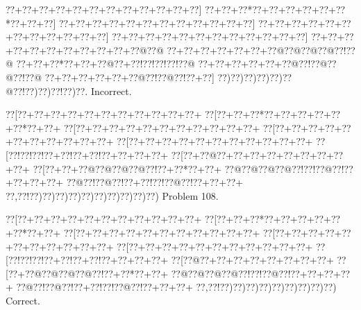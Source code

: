 \documentclass[a5paper]{article}
\begin{document}
\begin{center}
{\goo
\0??+\0??+\0??+\0??+\0??+\0??+\0??+\0??+\0??+\0??+\0??+\0??]
\0??+\0??+\0??*\0??+\0??+\0??+\0??+\0??+\0??*\0??+\0??+\0??]
\0??+\0??+\0??+\0??+\0??+\0??+\0??+\0??+\0??+\0??+\0??+\0??]
\0??+\0??+\0??+\0??+\0??+\0??+\0??+\0??+\0??+\0??+\0??+\0??]
\0??+\0??+\0??+\0??+\0??+\0??+\0??+\0??+\0??+\0??+\0??+\0??]
\0??+\0??+\0??+\0??+\0??+\0??+\0??+\0??+\0??+\0??+\0??@\0??@
\0??+\0??+\0??+\0??+\0??+\0??+\0??@\0??@\0??@\0??@\0??!\0??@
\0??+\0??+\0??*\0??+\0??+\0??@\0??+\0??!\0??!\0??!\0??!\0??@
\0??+\0??+\0??+\0??+\0??+\0??@\0??!\0??@\0??@\0??!\0??@
\0??+\0??+\0??+\0??+\0??+\0??@\0??!\0??@\0??!\0??+\0??]
\0??)\0??)\0??)\0??)\0??)\0??@\0??!\0??)\0??)\0??!\0??)\0??.
}
Incorrect. 

\end{center}
\newpage
\begin{center}
{\goo
\0??[\0??+\0??+\0??+\0??+\0??+\0??+\0??+\0??+\0??+\0??+\0??+
\0??[\0??+\0??+\0??*\0??+\0??+\0??+\0??+\0??+\0??*\0??+\0??+
\0??[\0??+\0??+\0??+\0??+\0??+\0??+\0??+\0??+\0??+\0??+\0??+
\0??[\0??+\0??+\0??+\0??+\0??+\0??+\0??+\0??+\0??+\0??+\0??+
\0??[\0??+\0??+\0??+\0??+\0??+\0??+\0??+\0??+\0??+\0??+\0??+
\0??[\0??!\0??!\0??!\0??+\0??!\0??+\0??!\0??+\0??+\0??+\0??+
\0??[\0??+\0??@\0??+\0??+\0??+\0??+\0??+\0??+\0??+\0??+\0??+
\0??[\0??+\0??+\0??@\0??@\0??@\0??@\0??!\0??+\0??*\0??+\0??+
\0??@\0??@\0??@\0??@\0??!\0??!\0??@\0??!\0??+\0??+\0??+\0??+
\0??@\0??!\0??@\0??!\0??+\0??!\0??!\0??@\0??!\0??+\0??+\0??+
\0??,\0??!\0??)\0??)\0??)\0??)\0??)\0??)\0??)\0??)\0??)\0??)
}
Problem 108.

\end{center}
\begin{center}
{\goo
\0??[\0??+\0??+\0??+\0??+\0??+\0??+\0??+\0??+\0??+\0??+\0??+
\0??[\0??+\0??+\0??*\0??+\0??+\0??+\0??+\0??+\0??*\0??+\0??+
\0??[\0??+\0??+\0??+\0??+\0??+\0??+\0??+\0??+\0??+\0??+\0??+
\0??[\0??+\0??+\0??+\0??+\0??+\0??+\0??+\0??+\0??+\0??+\0??+
\0??[\0??+\0??+\0??+\0??+\0??+\0??+\0??+\0??+\0??+\0??+\0??+
\0??[\0??!\0??!\0??!\0??+\0??!\0??+\0??!\0??+\0??+\0??+\0??+
\0??[\0??@\0??+\0??+\0??+\0??+\0??+\0??+\0??+\0??+
\0??[\0??+\0??@\0??@\0??@\0??@\0??!\0??+\0??*\0??+\0??+
\0??@\0??@\0??@\0??@\0??!\0??!\0??@\0??!\0??+\0??+\0??+\0??+
\0??@\0??!\0??@\0??!\0??+\0??!\0??!\0??@\0??!\0??+\0??+\0??+
\0??,\0??!\0??)\0??)\0??)\0??)\0??)\0??)\0??)\0??)\0??)
}
Correct. 

\end{center}
\end{document}
